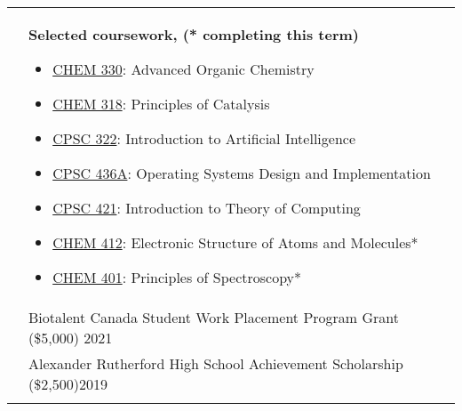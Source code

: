 \documentclass[letterpaper, 11pt]{article}
\begin{document}
\begin{longtable}{p{1.3in}p{4.8in}}
	 & \textbf{Selected coursework, (* completing this term)}
	\begin{itemize}[noitemsep,leftmargin=*]
		\item \underline{CHEM 330}: Advanced Organic Chemistry
		\item \underline{CHEM 318}: Principles of Catalysis
		\item \underline{CPSC 322}: Introduction to Artificial Intelligence
		\item \underline{CPSC 436A}: Operating Systems Design and Implementation
		\item \underline{CPSC 421}: Introduction to Theory of Computing
		\item \underline{CHEM 412}: Electronic Structure of Atoms and Molecules*
		\item \underline{CHEM 401}: Principles of Spectroscopy*
	\end{itemize}                                                                                                                                   \\



	{\color{Blue}{Honours and}}
	 & Biotalent Canada Student Work Placement Program Grant (\$5,000) \hfill 2021                                                                                                                            \\
	{\color{Blue}{Scholarships}}
	 & Alexander Rutherford High School Achievement Scholarship (\$2,500)\hfill 2019                                                                                                                          \\
	 &                                                                                                                                                                                                        \\


\end{longtable}
\end{document}
